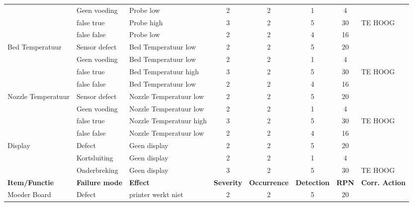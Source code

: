 \documentclass{article}
\begin{document}
\begin{landscape}
\begin{longtable}{|l|l|l|c|c|c|c|l|}
                                            & Geen voeding      & Probe low  & 2 & 2 & 1 &  4 & \\
                                            & false true        & Probe high & 3 & 2 & 5 & 30 & TE HOOG \\
                                            & false false       & Probe low  & 2 & 2 & 4 & 16 & \\ 
                                            \hline
        \multirow{4}{*}{Bed Temperatuur}    & Sensor defect     & Bed Temperatuur low  & 2 & 2 & 5 & 20 & \\
                                            & Geen voeding      & Bed Temperatuur low  & 2 & 2 & 1 &  4 & \\
                                            & false true        & Bed Temperatuur high & 3 & 2 & 5 & 30 & TE HOOG \\
                                            & false false       & Bed Temperatuur low  & 2 & 2 & 4 & 16 & \\ 
                                            \hline
        \multirow{4}{*}{Nozzle Temperatuur} & Sensor defect     & Nozzle Temperatuur low  & 2 & 2 & 5 & 20 & \\
                                            & Geen voeding      & Nozzle Temperatuur low  & 2 & 2 & 1 &  4 & \\
                                            & false true        & Nozzle Temperatuur high & 3 & 2 & 5 & 30 & TE HOOG \\
                                            & false false       & Nozzle Temperatuur low  & 2 & 2 & 4 & 16 & \\ 
                                            \hline          
        \multirow{3}{*}{Display}            & Defect            & Geen display  & 2 & 2 & 5 & 20 & \\ 
                                            & Kortsluiting      & Geen display  & 2 & 2 & 1 &  4 & \\
                                            & Onderbreking      & Geen display  & 3 & 2 & 5 & 30 & TE HOOG \\
                                            \hline 
        \newpage
        \hline
        \textbf{Item/Functie} & \textbf{Failure mode} & \textbf{Effect} & \textbf{Severity} & \textbf{Occurrence} & \textbf{Detection} & \textbf{RPN} & \textbf{Corr. Action} \\ \hline
        \multirow{15}{*}{Moeder Board}      & Defect                    & printer werkt niet        & 2 & 2 & 5 & 20 & \\

\end{longtable}
\end{landscape}
\end{document}
